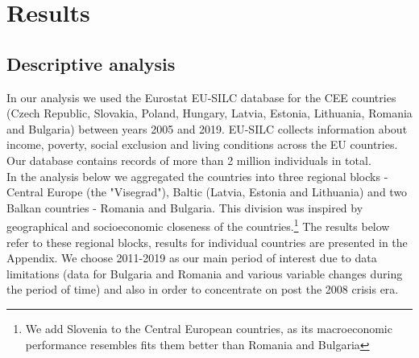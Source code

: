\documentclass{article}
\begin{document}

\section{Results}
\subsection{Descriptive analysis}
In our analysis we used the Eurostat EU-SILC database for the CEE countries (Czech Republic, Slovakia, Poland, Hungary, Latvia, Estonia, Lithuania, Romania and Bulgaria) between years 2005 and 2019. EU-SILC collects information about income, poverty, social exclusion and living conditions across the EU countries. Our database contains records of more than 2 million individuals in total.\\ In the analysis below we aggregated the countries into three regional blocks - Central Europe (the "Visegrad"), Baltic (Latvia, Estonia and Lithuania) and two Balkan countries - Romania and Bulgaria. This division was inspired by geographical and socioeconomic closeness of the countries.\footnote{We add Slovenia to the Central European countries, as its macroeconomic performance resembles fits them better than Romania and Bulgaria} %
The results below refer to these regional blocks, results for individual countries are presented in the Appendix. We choose 2011-2019 as our main period of interest due to data limitations (data for Bulgaria and Romania and various variable changes during the period of time) and also in order to concentrate on post the 2008 crisis era.
\end{document}
